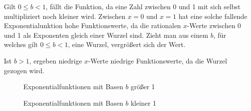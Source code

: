Gilt $0 \leq b < 1$, f\"{a}llt die Funktion, da eine Zahl zwischen 0 und 1 mit sich selbst multipliziert noch kleiner wird. Zwischen $x = 0$ und $x = 1$ hat eine solche fallende Exponentialunktion hohe Funktionswerte, da die rationalen $x$-Werte zwischen 0 und 1 als Exponenten gleich einer Wurzel sind. Zieht man aus einem $b$, f\"{u}r welches gilt $0 \leq b < 1$, eine Wurzel, vergr\"{o}\ss{}ert sich der Wert.

Ist $b > 1$, ergeben niedrige $x$-Werte niedrige Funktionswerte, da die Wurzel gezogen wird.

\begin{figure}[t!]
	\begin{floatrow}
		\ffigbox
		{
		} {\caption*{Exponentialfunktionen mit Basen $b$ gr\"{o}\ss{}er 1}}

		\ffigbox
		{
		} {\caption*{Exponentialfunktionen mit Basen $b$ kleiner 1}}
	\end{floatrow}
\end{figure}

